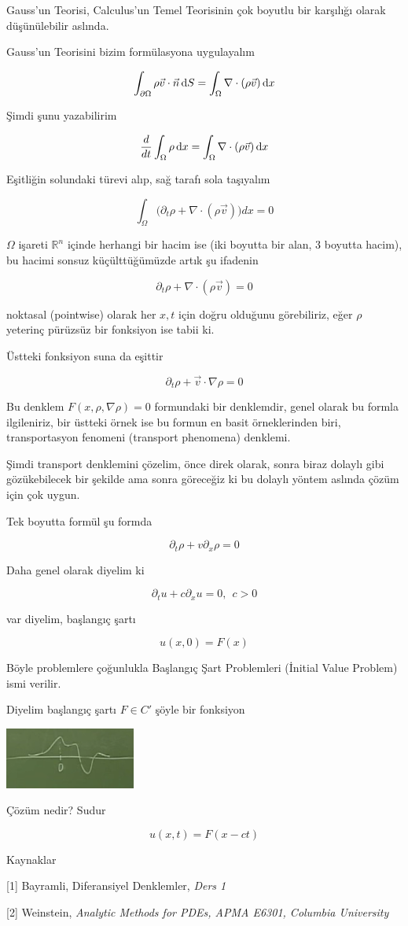 \documentclass[12pt,fleqn]{article}\usepackage{../../common}
\begin{document}
Gauss'un Teorisi, Calculus'un Temel Teorisinin çok boyutlu bir karşılığı
olarak düşünülebilir aslında.

Gauss'un Teorisini bizim formülasyona uygulayalım

$$ \int_{\partial \Omega} \rho \vec{v} \cdot \vec{n} \,\mathrm{d} S =
\int_\Omega \nabla \cdot (\rho \vec{v}) \,\mathrm{d} x 
$$

Şimdi şunu yazabilirim

$$
\frac{d}{dt} \int_\Omega \rho \,\mathrm{d} x = 
\int_\Omega \nabla \cdot (\rho \vec{v}) \,\mathrm{d} x
 $$

Eşitliğin solundaki türevi alıp, sağ tarafı sola taşıyalım

$$ \int_\Omega \bigg( 
\partial_t \rho + \nabla \cdot (\rho \vec{v}) 
\bigg)dx = 0
 $$

$\Omega$ işareti $\mathbb{R}^n$ içinde herhangi bir hacim ise (iki boyutta bir
alan, 3 boyutta hacim), bu hacimi sonsuz küçülttüğümüzde artık şu ifadenin 

$$ \partial_t \rho + \nabla \cdot (\rho \vec{v})  = 0 $$

noktasal (pointwise) olarak her $x,t$ için doğru olduğunu görebiliriz, eğer
$\rho$ yeterinç pürüzsüz bir fonksiyon ise tabii ki.

Üstteki fonksiyon suna da eşittir

$$ \partial_t \rho + \vec{v} \cdot \nabla \rho = 0$$

Bu denklem $F(x,\rho,\nabla \rho)=0$ formundaki bir denklemdir, genel
olarak bu formla ilgileniriz, bir üstteki örnek ise bu formun en basit
örneklerinden biri, transportasyon fenomeni (transport phenomena) denklemi.

Şimdi transport denklemini çözelim, önce direk olarak, sonra biraz dolaylı
gibi gözükebilecek bir şekilde ama sonra göreceğiz ki bu dolaylı yöntem
aslında çözüm için çok uygun. 

Tek boyutta formül şu formda

$$ \partial_t \rho + v \partial_x \rho = 0 $$

Daha genel olarak diyelim ki 

$$ \partial_t u + c\partial_x u = 0, \ \ c>0 $$

var diyelim, başlangıç şartı

$$ u(x,0) = F(x) $$

Böyle problemlere çoğunlukla Başlangıç Şart Problemleri (İnitial Value
Problem) ismi verilir. 

Diyelim başlangıç şartı $F \in C'$  şöyle bir fonksiyon

\includegraphics[height=2cm]{4_3.png}

Çözüm nedir? Sudur 

$$ u(x,t) = F(x-ct) $$


Kaynaklar

[1] Bayramli, Diferansiyel  Denklemler, {\em Ders 1}

[2] Weinstein, {\em Analytic Methods for PDEs, APMA E6301, Columbia University}
\end{document}
